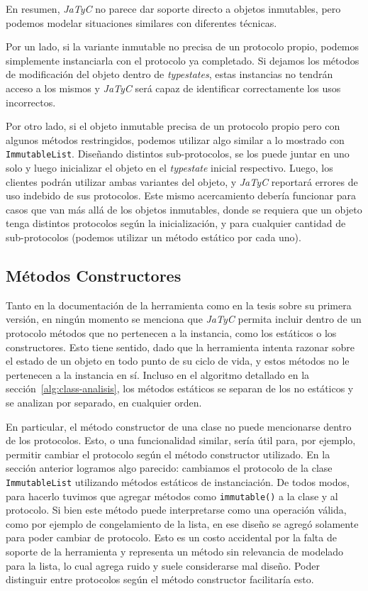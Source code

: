 En resumen, \textit{JaTyC} no parece dar soporte directo a objetos inmutables, pero podemos modelar situaciones similares con diferentes técnicas.

Por un lado, si la variante inmutable no precisa de un protocolo propio, podemos simplemente instanciarla con el protocolo ya completado. Si dejamos los métodos de modificación del objeto dentro de \textit{typestates}, estas instancias no tendrán acceso a los mismos y \textit{JaTyC} será capaz de identificar correctamente los usos incorrectos.

Por otro lado, si el objeto inmutable precisa de un protocolo propio pero con algunos métodos restringidos, podemos utilizar algo similar a lo mostrado con \texttt{ImmutableList}. Diseñando distintos sub-protocolos, se los puede juntar en uno solo y luego inicializar el objeto en el \textit{typestate} inicial respectivo. Luego, los clientes podrán utilizar ambas variantes del objeto, y \textit{JaTyC} reportará errores de uso indebido de sus protocolos. Este mismo acercamiento debería funcionar para casos que van más allá de los objetos inmutables, donde se requiera que un objeto tenga distintos protocolos según la inicialización, y para cualquier cantidad de sub-protocolos (podemos utilizar un método estático por cada uno).

\subsection{Métodos Constructores}

Tanto en la documentación de la herramienta como en la tesis sobre su primera versión, en ningún momento se menciona que \textit{JaTyC} permita incluir dentro de un protocolo métodos que no pertenecen a la instancia, como los estáticos o los constructores. Esto tiene sentido, dado que la herramienta intenta razonar sobre el estado de un objeto en todo punto de su ciclo de vida, y estos métodos no le pertenecen a la instancia en sí. Incluso en el algoritmo detallado en la sección~\ref{alg:class-analisis}, los métodos estáticos se separan de los no estáticos y se analizan por separado, en cualquier orden.

En particular, el método constructor de una clase no puede mencionarse dentro de los protocolos. Esto, o una funcionalidad similar, sería útil para, por ejemplo, permitir cambiar el protocolo según el método constructor utilizado. En la sección anterior logramos algo parecido: cambiamos el protocolo de la clase \texttt{ImmutableList} utilizando métodos estáticos de instanciación. De todos modos, para hacerlo tuvimos que agregar métodos como \texttt{immutable()} a la clase y al protocolo. Si bien este método puede interpretarse como una operación válida, como por ejemplo de congelamiento de la lista, en ese diseño se agregó solamente para poder cambiar de protocolo. Esto es un costo accidental por la falta de soporte de la herramienta y representa un método sin relevancia de modelado para la lista, lo cual agrega ruido y suele considerarse mal diseño. Poder distinguir entre protocolos según el método constructor facilitaría esto.


